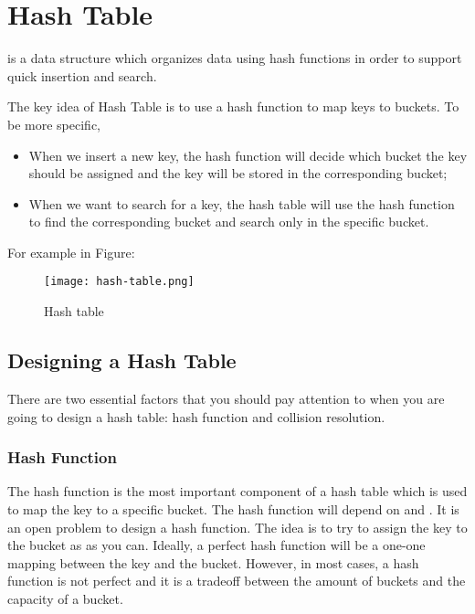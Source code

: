 
\chapter{Hash Table}

 is a data structure which organizes data using hash functions in order to support quick insertion and search.

The key idea of Hash Table is to use a hash function to map keys to buckets.
To be more specific,
\begin{itemize}
\item When we insert a new key, the hash function will decide which bucket the key should be assigned and the key will be stored in the corresponding bucket;
\item When we want to search for a key, the hash table will use the  hash function to find the corresponding bucket and search only in the specific bucket.
\end{itemize}

For example in Figure:
\begin{figure}[!ht]
  \centering
  \texttt{[image: hash-table.png]}
  \caption{Hash table}
  \label{fig:hash-table}
\end{figure}


\section{Designing a Hash Table}
\label{sec:designing-hash-table}

There are two essential factors that you should pay attention to when you are going to design a hash table: hash function and collision resolution.

\subsection{Hash Function}
\label{sec:hash-function}

The hash function is the most important component of a hash table which is used to map the key to a specific bucket.
The hash function will depend on  and .
It is an open problem to design a hash function.
The idea is to try to assign the key to the bucket as  as you can.
Ideally, a perfect hash function will be a one-one mapping between the key and the bucket.
However, in most cases, a hash function is not perfect and it is a tradeoff between the amount of buckets and the capacity of a bucket.


